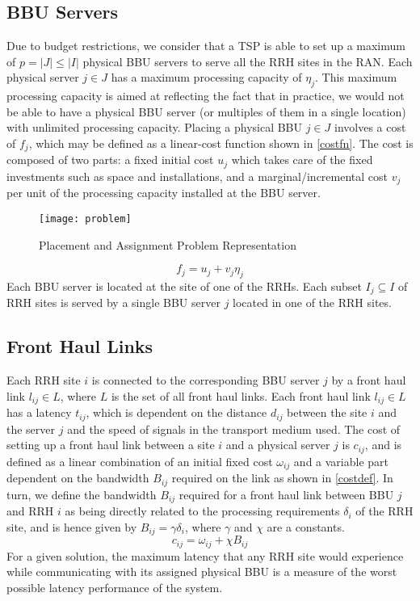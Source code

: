 \documentclass[conference]{IEEEtran}
\begin{document}
\subsection{\ac{BBU} Servers}
Due to budget restrictions, we consider that a TSP is able to set up a maximum of $p = |J|\leq |I|$ physical BBU servers to serve all the RRH sites in the RAN. Each physical server $j \in J$ has a maximum processing capacity of $\eta_j$. This maximum processing capacity is aimed at reflecting the fact that in practice, we would not be able to have a physical \ac{BBU} server (or multiples of them in a single location) with unlimited processing capacity. Placing a physical BBU $j \in J$ involves a cost of $f_j$, which may be defined as a linear-cost function shown in \eqref{costfn}. The cost is composed of two parts: a fixed initial cost $u_j$ which takes care of the fixed investments such as space and installations, and a marginal/incremental cost $v_j$ per unit of the processing capacity installed at the BBU server.

\begin{figure}[t]
\centering
{\texttt{[image: problem]}}
  \caption{Placement and Assignment Problem Representation}
  \label{problem}
\end{figure}

\begin{equation}
f_j = u_j + v_j \eta_j
\label{costfn}
\end{equation}
Each \ac{BBU} server is located at the site of one of the \acp{RRH}. Each subset $I_j \subseteq I$ of RRH sites is served by a single BBU server $j$ located in one of the \ac{RRH} sites.
\subsection{Front Haul Links}
Each \ac{RRH} site $i$ is connected to the corresponding \ac{BBU} server $j$ by a front haul link $l_{ij} \in L$, where $L$ is the set of all front haul links.
Each front haul link $l_{ij}\in L$ has a latency $t_{ij}$, which is dependent on the distance $d_{ij}$ between the site $i$ and the server $j$ and the speed of signals in the transport medium used. The cost of setting up a front haul link between a site $i$ and a physical server $j$ is $c_{ij}$, and is defined as a linear combination of an initial fixed cost $\omega_{ij}$ and a variable part dependent on the bandwidth $B_{ij}$ required on the link as shown in \eqref{costdef}. In turn, we define the bandwidth $B_{ij}$ required for a front haul link between \ac{BBU} $j$ and \ac{RRH} $i$ as being directly related to the processing requirements $\delta_i$ of the \ac{RRH} site, and is hence given by $B_{ij} = \gamma \delta_i$, where $\gamma$ and $\chi$ are a constants.
\begin{equation}
c_{ij} = \omega_{ij} + \chi B_{ij}
\label{costdef}
\end{equation}
For a given solution, the maximum latency that any RRH site would experience while communicating with its assigned physical \ac{BBU} is a measure of the worst possible latency performance of the system.
\end{document}
